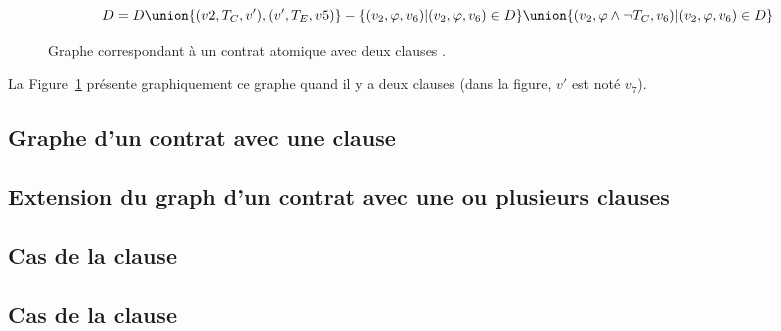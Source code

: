 $$D = D \union \{(v2, T_C, v'), (v', T_E, v5)\}
      - \{(v_2, \varphi, v_6) \vert (v_2, \varphi, v_6) \in D\} \union
      \{(v_2, \varphi \land \neg T_C, v_6) \vert (v_2, \varphi, v_6) \in D\}$$

\begin{figure}


\caption{\label{figure:test:throwable_graph} Graphe correspondant à un contrat
atomique avec deux clauses \athrowable.}

\end{figure}

La Figure~\ref{figure:test:throwable_graph} présente graphiquement ce graphe
quand il y a deux clauses \athrowable (dans la figure, $v'$ est noté $v_7$).

\subsection{Graphe d'un contrat avec une clause \abehavior}
\label{subsection:test:behavior_graph}

\subsection{Extension du graph d'un contrat avec une ou plusieurs clauses
\abehavior}
\label{subsection:test:behaviors_graph}

\subsection{Cas de la clause \adefault}
\label{subsection:test:default_graph}

\subsection{Cas de la clause \ainvariant}
\label{subsection:test:invariant_graph}

